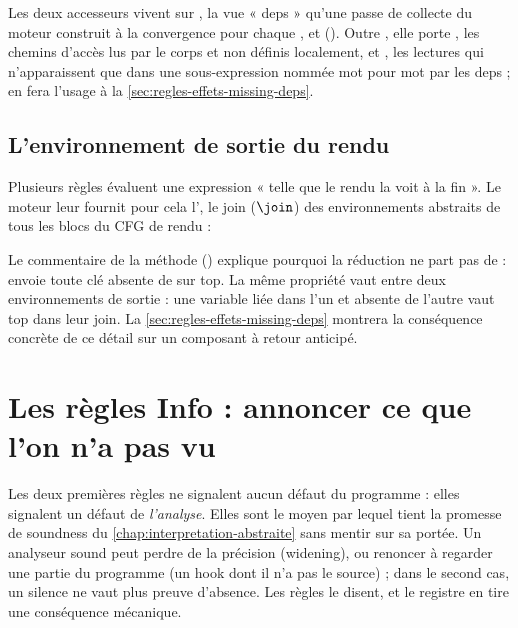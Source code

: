 Les deux accesseurs vivent sur , la vue « deps » qu'une passe de collecte du moteur construit à la convergence pour chaque ,  et  (). Outre , elle porte , les chemins d'accès lus par le corps et non définis localement, et , les lectures qui n'apparaissent que dans une sous-expression nommée mot pour mot par les deps ;  en fera l'usage à la \cref{sec:regles-effets-missing-deps}.

\subsection{L'environnement de sortie du rendu}

Plusieurs règles évaluent une expression « telle que le rendu la voit à la fin ». Le moteur leur fournit pour cela l', le join ($\join$) des environnements abstraits de tous les blocs  du CFG de rendu :


Le commentaire de la méthode () explique pourquoi la réduction ne part pas de  :  envoie toute clé absente de  sur top. La même propriété vaut entre deux environnements de sortie : une variable liée dans l'un et absente de l'autre vaut top dans leur join. La \cref{sec:regles-effets-missing-deps} montrera la conséquence concrète de ce détail sur un composant à retour anticipé.


\section{Les règles Info : annoncer ce que l'on n'a pas vu}
\label{sec:regles-effets-info}

Les deux premières règles ne signalent aucun défaut du programme : elles signalent un défaut de \emph{l'analyse}. Elles sont le moyen par lequel \reactant{} tient la promesse de soundness du \cref{chap:interpretation-abstraite} sans mentir sur sa portée. Un analyseur sound peut perdre de la précision (widening), ou renoncer à regarder une partie du programme (un hook dont il n'a pas le source) ; dans le second cas, un silence ne vaut plus preuve d'absence. Les règles \Info{} le disent, et le registre en tire une conséquence mécanique.

